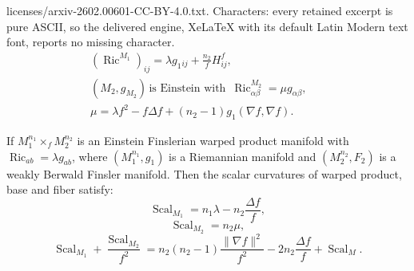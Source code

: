 \documentclass[10pt,a4paper]{amsart}
\begin{document}
licenses/arxiv-2602.00601-CC-BY-4.0.txt. Characters: every retained excerpt is pure ASCII, so the delivered engine, XeLaTeX with its default Latin Modern text font, reports no missing character.
		\begin{align}
		(\operatorname{Ric}^{M_1})_{ij}=\lambda g_1{_{ij}}+\frac{{n_2}}{f}H_{ij}^f,\label{f8}&&\\
			 (M_2,g_{M_2})\,\text{is  Einstein with }\, \operatorname{Ric}_{\alpha\beta}^{M_2}=\mu g_{\alpha\beta},\label{f9}&&\\
		 \mu=\lambda f^2 - f \Delta f + (n_2-1)  g_1(\nabla f,\nabla f).\label{f10}
		\end{align}

\begin{corollary}
If $M_{1}^{n_1}\times_{f}M_{2}^{n_2}$ is an Einstein Finslerian warped product manifold with 
$\operatorname{Ric}_{ab}=\lambda g_{ab}$, 
where $(M_{1}^{n_1},g_1)$ is a Riemannian manifold and $(M_2^{n_2},F_2)$ is a weakly Berwald Finsler manifold.
Then the scalar curvatures 
 of warped product, base and fiber satisfy:
\begin{equation}\label{1.4}
			\operatorname{Scal}_{M_1}=n_1\lambda- n_2 \frac{\Delta f}{f},
		\end{equation}
 \begin{equation}\label{1.5}
			\operatorname{Scal}_{M_2}=n_2\mu,
		\end{equation}
  \begin{equation}\label{1.6}
\operatorname{Scal}_{M_1}+\dfrac{\operatorname{Scal}_{M_2}}{f^2}=n_2(n_2 -1)\dfrac{\|\nabla f\|^2}{f^2}-2n_2\frac{\Delta f}{f}+\operatorname{Scal}_M .		
	\end{equation}
    
\end{corollary}
\end{document}
